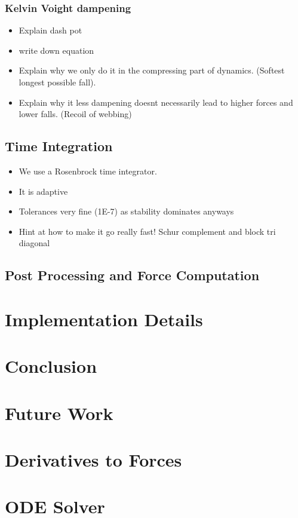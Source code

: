 \documentclass[a4paper,10pt]{article}
\begin{document}
\subsubsection{Kelvin Voight dampening}%
\label{ssub:Kelvin Voight dampening}

\begin{itemize}
   \item Explain dash pot
   \item write down equation
   \item Explain why we only do it in the compressing part of dynamics. (Softest longest possible fall). 
   \item Explain why it less dampening doesnt necessarily lead to higher forces and lower falls. (Recoil of webbing)
\end{itemize}


\subsection{Time Integration}%
\label{sub:odesolver}

\begin{itemize}
   \item We use a Rosenbrock time integrator.
   \item It is adaptive
   \item Tolerances very fine (1E-7) as stability dominates anyways
   \item Hint at how to make it go really fast! Schur complement and block tri diagonal
\end{itemize}


\subsection{Post Processing and Force Computation}%
\label{sub:postproc}

\section{Implementation Details}
\label{sec:impl}

\section{Conclusion}
\label{sec:concl}

\section{Future Work}
\label{sec:future_work}

\appendix
\section{Derivatives to Forces}
\section{ODE Solver}
\end{document}
